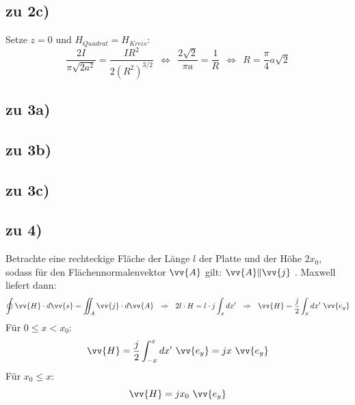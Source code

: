 \documentclass[a4paper,12pt]{article}
\begin{document}
\subsection*{zu 2c)}
Setze $z=0$ und $H_{Quadrat}=H_{Kreis}$: $$\frac{2I}{\pi\sqrt{2a^2}}=\frac{IR^2}{2(R^2)^{3/2}}\ \ \Leftrightarrow\ \ \frac{2\sqrt{2}}{\pi a}=\frac{1}{R}\ \ \Leftrightarrow\ \ R=\frac{\pi}{4}a\sqrt{2}$$
\subsection*{zu 3a)}
\subsection*{zu 3b)}
\subsection*{zu 3c)}
\subsection*{zu 4)}
Betrachte eine rechteckige Fläche der Länge $l$ der Platte und der Höhe $2x_0$, sodass für den Flächennormalenvektor $\vv{A}$ gilt: $\vv{A}\|\vv{j}$ . Maxwell liefert dann: $$\oint\vv{H}\cdot d\vv{s}=\iint_A \vv{j}\cdot d\vv{A}\ \ \Rightarrow\ \ 2l\cdot H = l\cdot j\int_x dx'\ \ \Rightarrow\ \ \vv{H} = \frac j2\int_x dx'\ \vv{e_y}$$
Für $0\le x<x_0$: $$\vv{H}=\frac j2\int_{-x}^{x}dx'\ \vv{e_y}=jx\ \vv{e_y}$$
Für $x_0\le x$: $$\vv{H}=jx_0\ \vv{e_y}$$
\end{document}
